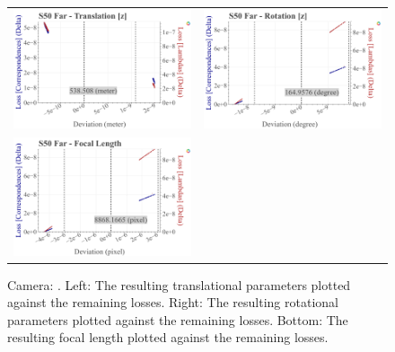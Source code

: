\begin{figure}[!ht]
\begin{tabular}{cc}
    \includegraphics[width=0.45 \linewidth]{diagrams/calibration/s50_s_far/parameters.csv/Translation[z]_vs_Loss[Correspondences]_vs_Loss[Lambdas]_cluster_All.png} &
    \includegraphics[width=0.45 \linewidth]{diagrams/calibration/s50_s_far/parameters.csv/Rotation[z]_vs_Loss[Correspondences]_vs_Loss[Lambdas]_cluster_All.png} \\

    \includegraphics[width=0.45 \linewidth]{diagrams/calibration/s50_s_far/parameters.csv/FocalLength_vs_Loss[Correspondences]_vs_Loss[Lambdas]_cluster_All.png} &

  \end{tabular}
\caption{
  Camera: .
  Left: The resulting translational parameters plotted against the remaining losses. 
  Right: The resulting rotational parameters plotted against the remaining losses.
  Bottom: The resulting focal length  plotted against the remaining losses.
    }
\label{fig:static_calibration_algorithmic_error_s50_s_far}
\end{figure}

